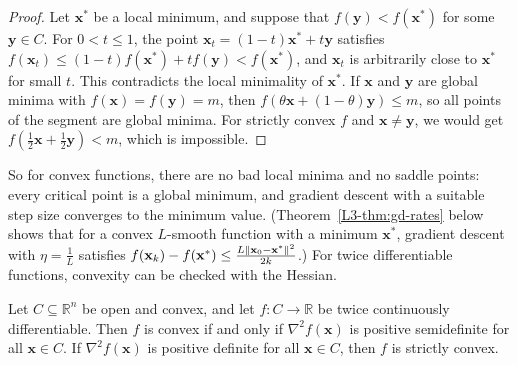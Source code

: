 \begin{proof}
    Let $\mathbf{x}^*$ be a local minimum, and suppose that $f(\mathbf{y}) < f(\mathbf{x}^*)$ for some $\mathbf{y} \in C$. For $0 < t \leq 1$, the point $\mathbf{x}_t = (1 - t)\mathbf{x}^* + t\mathbf{y}$ satisfies $f(\mathbf{x}_t) \leq (1 - t)f(\mathbf{x}^*) + tf(\mathbf{y}) < f(\mathbf{x}^*)$, and $\mathbf{x}_t$ is arbitrarily close to $\mathbf{x}^*$ for small $t$. This contradicts the local minimality of $\mathbf{x}^*$. If $\mathbf{x}$ and $\mathbf{y}$ are global minima with $f(\mathbf{x}) = f(\mathbf{y}) = m$, then $f(\theta\mathbf{x} + (1 - \theta)\mathbf{y}) \leq m$, so all points of the segment are global minima. For strictly convex $f$ and $\mathbf{x} \neq \mathbf{y}$, we would get $f(\frac{1}{2}\mathbf{x} + \frac{1}{2}\mathbf{y}) < m$, which is impossible.
\end{proof}

So for convex functions, there are no bad local minima and no saddle points: every critical point is a global minimum, and gradient descent with a suitable step size converges to the minimum value. (Theorem~\ref{L3-thm:gd-rates} below shows that for a convex $L$-smooth function with a minimum $\mathbf{x}^*$, gradient descent with $\eta = \frac{1}{L}$ satisfies $f(\mathbf{x}_k) - f(\mathbf{x}^*) \leq \frac{L\lVert \mathbf{x}_0 - \mathbf{x}^* \rVert^2}{2k}$.) For twice differentiable functions, convexity can be checked with the Hessian.

\begin{theorem}\label{L3-thm:convex-second-order}
    Let $C \subseteq \mathbb{R}^n$ be open and convex, and let $f: C \to \mathbb{R}$ be twice continuously differentiable. Then $f$ is convex if and only if $\nabla^2 f(\mathbf{x})$ is positive semidefinite for all $\mathbf{x} \in C$. If $\nabla^2 f(\mathbf{x})$ is positive definite for all $\mathbf{x} \in C$, then $f$ is strictly convex.
\end{theorem}


